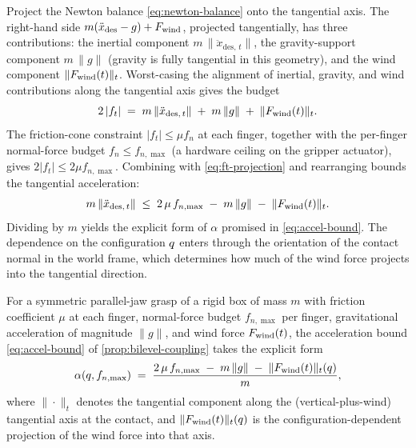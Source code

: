 Project the Newton balance \eqref{eq:newton-balance} onto the
tangential axis. The right-hand side
$m(\ddot{x}_{\mathrm{des}} - g) + F_{\mathrm{wind}}$, projected
tangentially, has three contributions: the inertial component
$m\,\|\ddot{x}_{\mathrm{des},\, t}\|$, the gravity-support
component $m\,\|g\|$ (gravity is fully tangential in this
geometry), and the wind component $\|F_{\mathrm{wind}}(t)\|_{t}$.
Worst-casing the alignment of inertial, gravity, and wind
contributions along the tangential axis gives the budget
\begin{equation}
\label{eq:ft-projection}
  2\, |f_{t}|
  \;=\;
  m \,\|\ddot{x}_{\mathrm{des},\, t}\|
  \;+\; m\,\|g\|
  \;+\; \|F_{\mathrm{wind}}(t)\|_{t}.
\end{equation}
The friction-cone constraint $|f_{t}| \le \mu f_{n}$ at each
finger, together with the per-finger normal-force budget
$f_{n} \le f_{n,\max}$ (a hardware ceiling on the gripper
actuator), gives $2|f_{t}| \le 2 \mu f_{n,\max}$. Combining
with \eqref{eq:ft-projection} and rearranging bounds the
tangential acceleration:
\begin{equation}
\label{eq:accel-bound-derivation}
  m \,\|\ddot{x}_{\mathrm{des},\, t}\|
  \;\le\;
  2\, \mu \, f_{n,\max} \;-\; m\,\|g\| \;-\; \|F_{\mathrm{wind}}(t)\|_{t}.
\end{equation}
Dividing by $m$ yields the explicit form of $\alpha$
promised in \eqref{eq:accel-bound}. The dependence on the
configuration $q$ enters through the orientation of
the contact normal in the world frame, which determines how
much of the wind force projects into the tangential direction.

\begin{proposition}\label{prop:accel-bound-explicit}
For a symmetric parallel-jaw grasp of a rigid box of mass $m$
with friction coefficient $\mu$ at each finger, normal-force
budget $f_{n,\max}$ per finger, gravitational acceleration of
magnitude $\|g\|$, and wind force $F_{\mathrm{wind}}(t)$, the acceleration
bound \eqref{eq:accel-bound} of \cref{prop:bilevel-coupling}
takes the explicit form
\begin{equation}
\label{eq:alpha-explicit}
  \alpha(q, f_{n,\max})
  \;=\;
  \frac{2\, \mu\, f_{n,\max}
        \;-\; m\,\|g\|
        \;-\; \|F_{\mathrm{wind}}(t)\|_{t}(q)}{m},
\end{equation}
where $\|\cdot\|_{t}$ denotes the tangential component along
the (vertical-plus-wind) tangential axis at the contact, and
$\|F_{\mathrm{wind}}(t)\|_{t}(q)$ is the configuration-dependent
projection of the wind force into that axis.
\end{proposition}

